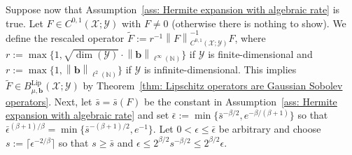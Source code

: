 \documentclass[namedate,webpdf]{ima-authoring-template-blank}
\newcommand*{\Lip}{\mathrm{Lip}}  %
\newcommand*{\nm}[1]{{\left\|#1\right \|}}
\numberwithin{counter}{section}
\numberwithin{equation}{section}
\theoremstyle{plain}
\theoremstyle{definition}
\newcommand*{\cX}{\mathcal{X}}
\newcommand*{\cY}{\mathcal{Y}}
\newcommand*{\bbN}{\mathbb{N}}
\newcommand*{\wtF}{\widetilde{F}}
\theoremstyle{thmstyletwo}
\begin{document}
Suppose now that Assumption~\ref{ass: Hermite expansion with algebraic rate} is true. Let \(F \in C^{0, 1}(\cX; \cY)\) with \(F \neq 0\) (otherwise there is nothing to show). We define the rescaled operator \(\wtF := r^{-1} \nm{F}_{C^{0, 1}(\cX; \cY)}^{-1} F\), where \(r := \max\{ 1, \sqrt{\dim(\cY)} \cdot \nm{\bm{b}}_{\ell^{\infty}(\bbN)}\}\) if \(\cY\) is finite-dimensional and \(r := \max\{1, \nm{\bm{b}}_{\ell^2(\bbN)}\}\) if \(\cY\) is infinite-dimensional. This implies \(\wtF \in B_{\mu, \bm{b}}^{\Lip}(\cX; \cY)\) by Theorem~\ref{thm: Lipschitz operators are Gaussian Sobolev operators}.
Next, let \(\bar{s} = \bar{s}(F)\) be the constant in Assumption~\ref{ass: Hermite expansion with algebraic rate} and set \(\bar{\epsilon} := \min\{ \bar{s}^{- \beta / 2}, e^{- \beta / (\beta + 1)} \}\) so that \(\bar{\epsilon}^{(\beta + 1) / \beta} = \min\{ \bar{s}^{- (\beta + 1) / 2}, e^{-1} \}\). Let \(0 < \epsilon \leq \bar{\epsilon}\) be arbitrary and choose \(s := \lceil \epsilon^{-2 / \beta} \rceil \) so that \( s \geq \bar{s} \) and \( \epsilon \leq 2^{\beta / 2} s^{- \beta / 2} \leq 2^{\beta / 2}  \epsilon \).
\end{document}
